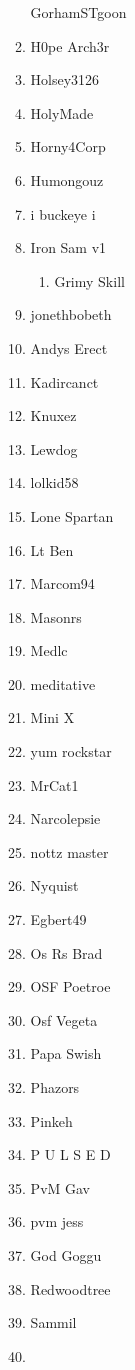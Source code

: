 \documentclass{article}
\begin{document}
\begin{enumerate}[I]
\begin{enumerate}[I]
	GorhamSTgoon
      \item
	H0pe Arch3r
      \item
	Holsey3126
      \item
	HolyMade
      \item
	Horny4Corp
      \item
	Humongouz
      \item
	i buckeye i
      \item
	Iron Sam v1
	  \begin{enumerate}[I]
	    \item
	      Grimy Skill
	  \end{enumerate}
      \item
	jonethbobeth
      \item
	Andys Erect
      \item
	Kadircanct
      \item
	Knuxez
      \item
	Lewdog
      \item
	lolkid58
      \item
	Lone Spartan
      \item
	Lt Ben
      \item
	Marcom94
      \item
	Masonrs
      \item
	Medlc
      \item
	meditative
      \item
	Mini X
      \item
	yum rockstar
      \item
	MrCat1
      \item
	Narcolepsie
      \item
	nottz master
      \item
	Nyquist
      \item
	Egbert49
      \item
	Os Rs Brad
      \item
	OSF Poetroe
      \item
	Osf Vegeta
      \item
	Papa Swish
      \item
	Phazors
      \item
	Pinkeh
      \item
	P U L S E D
      \item
	PvM Gav
      \item
	pvm jess
      \item
	God Goggu
      \item
	Redwoodtree
      \item
	Sammil
      \item

\end{enumerate}
\end{enumerate}
\end{document}
